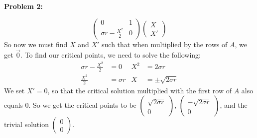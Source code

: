 \documentclass[11pt]{article}
\newcommand{\bmath}[1]{\boldmath#1\unboldmath}
\newenvironment{problem}[1]{\textbf{Problem #1: }}{\newpage}
\begin{document}
\begin{problem}{2}
\begin{enumerate}[label = (\alph*)]
\[			\begin{pmatrix}
			0 & 1 \\
			\sigma r - \frac{X^2}{2} & 0
			\end{pmatrix}
			\begin{pmatrix}
			X \\ X'
			\end{pmatrix}
			\]  
			So now we must find $X$ and $X'$ such that when multiplied by the rows of \bmath{$A$}, we get \bmath{$\vec{0}$}.
			To find our critical points, we need to solve the following:
			\begin{align*}
				\sigma r - \frac{X^2}{2} &= 0 & X^2 &= 2\sigma r  \\
				 \frac{X^2}{2} &= \sigma r & X &= \pm \sqrt{2\sigma r}  			
			\end{align*} 
			We set $X' = 0$, so that the critical solution multiplied with the first row of \bmath{$A$} also equals 0.
			So we get the critical points to be \bmath{$\begin{pmatrix} \sqrt{2\sigma r} \\ 0 \end{pmatrix} $}, \bmath{$\begin{pmatrix} -\sqrt{2\sigma r} \\ 0 \end{pmatrix} $}, and the trivial solution \bmath{$\begin{pmatrix} 0 \\ 0	\end{pmatrix}$}. 
			
			\newpage
			

\end{enumerate}
\end{problem}
\end{document}
